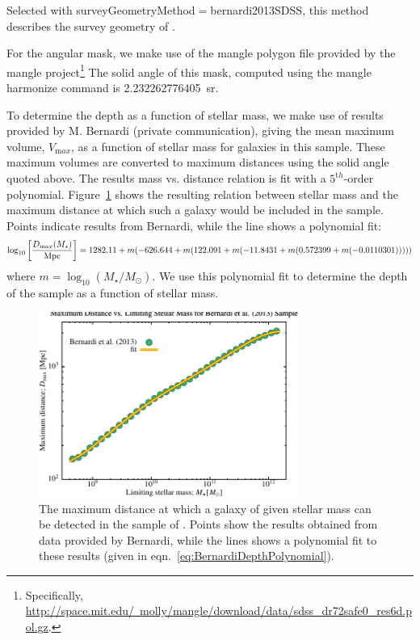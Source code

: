 Selected with {\normalfont \ttfamily surveyGeometryMethod}$=${\normalfont \ttfamily bernardi2013SDSS}, this method describes the survey geometry of \cite{bernardi_massive_2013}. 

For the angular mask, we make use of the \gls{mangle} polygon file provided by the \gls{mangle} project\footnote{Specifically, \href{http://space.mit.edu/~molly/mangle/download/data/sdss_dr72safe0_res6d.pol.gz}{http://space.mit.edu/~molly/mangle/download/data/sdss\_dr72safe0\_res6d.pol.gz}.} The solid angle of this mask, computed using the \gls{mangle} {\normalfont \ttfamily harmonize} command is 2.232262776405~sr.

To determine the depth as a function of stellar mass, we make use of results provided by M. Bernardi (private communication), giving the mean maximum volume, $V_{\mathrm max}$, as a function of stellar mass for galaxies in this sample. These maximum volumes are converted to maximum distances using the solid angle quoted above. The results mass vs. distance relation is fit with a $5^{\mathrm th}$-order polynomial. Figure~\ref{fig:BernardiSDSSDepthFit} shows the resulting relation between stellar mass and the maximum distance at which such a galaxy would be included in the sample. Points indicate results from Bernardi, while the line shows a polynomial fit:
\begin{equation}
 \log_{10} \left[ {D_{\mathrm max}(M_\star) \over \hbox{Mpc}}\right] = 1282.11+m (-626.644+m (122.091+m (-11.8431+m (0.572399+m (-0.0110301)))))
 \label{eq:BernardiDepthPolynomial}
\end{equation}
where $m= \log_{10}(M_\star/M_\odot)$. We use this polynomial fit to determine the depth of the sample as a function of stellar mass.

\begin{figure}
 \begin{center}
 \includegraphics[width=85mm,trim=0mm 0mm 0mm 4mm,clip]{Plots/DataAnalysis/BernardiSDSSMassLuminosityRelation.pdf}
 \end{center}
 \caption{The maximum distance at which a galaxy of given stellar mass can be detected in the sample of \protect\cite{bernardi_massive_2013}. Points show the results obtained from data provided by Bernardi, while the lines shows a polynomial fit to these results (given in eqn.~\ref{eq:BernardiDepthPolynomial}).}
 \label{fig:BernardiSDSSDepthFit}
\end{figure}

